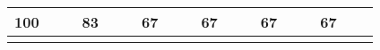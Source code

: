 \begin{landscape}
\begin{table}[h!]
\begin{tabular}{lcllcllcllcllcllcl}
\multicolumn{1}{|l|}{100} & \multicolumn{1}{c|}{}                                                                                                   & \multicolumn{1}{l|}{}        & \multicolumn{1}{l|}{83} & \multicolumn{1}{c|}{}                                                                                                      & \multicolumn{1}{l|}{}         & \multicolumn{1}{l|}{67} & \multicolumn{1}{c|}{}                                                                                                   & \multicolumn{1}{l|}{}         & \multicolumn{1}{l|}{67} & \multicolumn{1}{c|}{}                                                                                            & \multicolumn{1}{l|}{}         & \multicolumn{1}{l|}{67} & \multicolumn{1}{c|}{}                                                                                                              & \multicolumn{1}{l|}{}         & \multicolumn{1}{l|}{67} & \multicolumn{1}{c|}{}                                                                                                        & \multicolumn{1}{l|}{}         \\ \hline
                          & \multicolumn{1}{l}{}                                                                                                    &                              &                         & \multicolumn{1}{l}{}                                                                                                       &                               &                         & \multicolumn{1}{l}{}                                                                                                    &                               &                         & \multicolumn{1}{l}{}                                                                                             &                               &                         & \multicolumn{1}{l}{}                                                                                                               &                               &                         & \multicolumn{1}{l}{}                                                                                                         &                               \\ \hline

\end{tabular}
\end{table}
\end{landscape}
